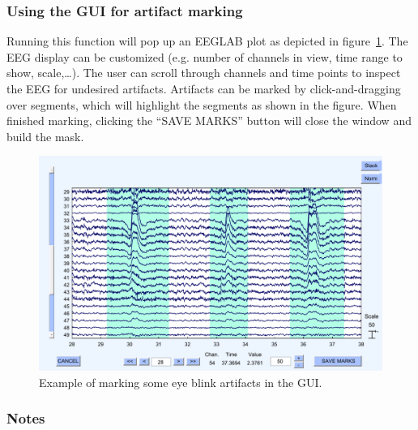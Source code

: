 \documentclass[11pt]{article}
\begin{document}
\subsubsection{Using the GUI for artifact marking}

Running this function will pop up an EEGLAB plot as depicted in figure~\ref{fig:getmask}. The EEG display can be customized (e.g. number of channels in view, time range to show, scale,\ldots). The user can scroll through channels and time points to inspect the EEG for undesired artifacts. Artifacts can be marked by click-and-dragging over segments, which will highlight the segments as shown in the figure. When finished marking, clicking the ``SAVE MARKS'' button will close the window and build the mask.

\begin{figure}[h]
    \centering
    \includegraphics[width=.9\textwidth]{fig_getmask.pdf}
    \caption{Example of marking some eye blink artifacts in the GUI.}
    \label{fig:getmask}
\end{figure}

\newpage
\subsubsection{Notes}
\label{tips}
\end{document}
